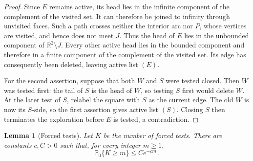 \documentclass[11pt]{amsart}
\theoremstyle{plain}
\newtheorem{lemma}[theorem]{Lemma}
\theoremstyle{definition}
\newcommand{\R}{\mathbb R}
\renewcommand{\P}{\mathbb P}
\begin{document}
\begin{proof}
		Since $E$ remains active, its head lies in the infinite component of the
		complement of the visited set.  It can therefore be joined to infinity through
		unvisited faces.  Such a path crosses neither the interior arc nor $P$, whose
		vertices are visited, and hence does not meet $J$.  Thus the head of $E$ lies
		in the unbounded component of $\R^2\setminus J$.  Every other active head lies
		in the bounded component and therefore in a finite component of the complement
		of the visited set.  Its edge has consequently been deleted, leaving active
		list $(E)$.

		For the second assertion, suppose that both $W$ and $S$ were tested closed.
		Then $W$ was tested first: the tail of $S$ is the head of $W$, so testing $S$
		first would delete $W$.  At the later test of $S$, relabel the square with $S$
		as the current edge.  The old $W$ is now its $S$-side, so the first assertion
		gives active list $(S)$.  Closing $S$ then terminates the exploration before
		$E$ is tested, a contradiction.
	\end{proof}
	
	\begin{lemma}[Forced tests]
		\label{lem:square-forced-tests}
		Let $K$ be the number of forced tests.  There are constants $c,C>0$ such
		that, for every integer $m\geq1$,
		\begin{equation}\label{eq:square-forced-tail}
			\P_0\{K\geq m\}\leq Ce^{-cm}\, .
		\end{equation}
	\end{lemma}
	
\end{document}
